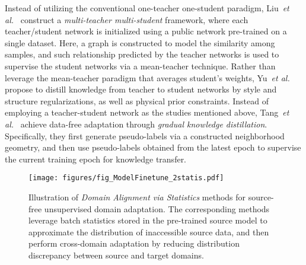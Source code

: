 \documentclass[10pt,journal,compsoc]{IEEEtran}
\def\etal{{\em et al.}}
\begin{document}
Instead of utilizing the conventional one-teacher one-student paradigm, Liu~\etal~\cite{liu2021graph} construct a \emph{multi-teacher multi-student} framework, where each teacher/student network is initialized using a public network pre-trained on a single dataset.
Here, a graph is constructed to model the similarity %
among samples, and such relationship predicted by the teacher networks is used to supervise the student networks via a mean-teacher technique.
Rather than leverage the mean-teacher paradigm that averages student's weights, Yu~\etal~\cite{yu2022source} propose to distill knowledge from teacher to student networks by style and structure regularizations, as well as physical prior constraints.
Instead of employing a teacher-student network as the studies mentioned above, Tang~\etal~\cite{tang2021model} achieve data-free adaptation through \emph{gradual knowledge distillation}.
Specifically, they first generate pseudo-labels via a constructed neighborhood geometry, and then use pseudo-labels obtained from the latest epoch to supervise the current training epoch for knowledge transfer.




\begin{figure}[!t]
\setlength{\abovecaptionskip}{0pt}
\setlength{\belowcaptionskip}{-2pt}
\setlength{\abovedisplayskip}{-2pt}
\setlength{\belowdisplayskip}{-2pt}
	\centering
	\texttt{[image: figures/fig\_ModelFinetune\_2statis.pdf]}
	\caption{Illustration of \emph{Domain Alignment via Statistics} methods for source-free unsupervised domain adaptation.
	The corresponding methods leverage batch statistics stored in the pre-trained source model to approximate the distribution of inaccessible source data, and then perform cross-domain adaptation by reducing distribution discrepancy between source and target domains.}
	\label{fig_ModelFinetune_2statis}
\end{figure}
\end{document}
